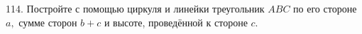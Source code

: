 114. Постройте с помощью циркуля и линейки треугольник $ABC$ по его стороне $a,$ сумме сторон $b+c$ и высоте, проведённой к стороне $c.$\\

